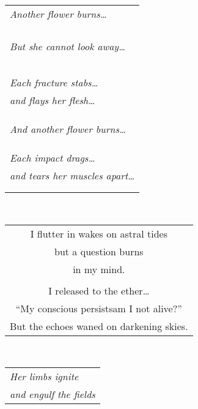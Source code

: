 \documentclass{article}
\begin{document}
\begin{center}
\begin{tabular}{l}
\textit{Another flower burns\ldots} \\
\\
\\
\\
\\
\textit{But she cannot look away\ldots} \\
\\
\\
\\
\\
\\
\textit{Each fracture stabs\ldots} \\
\textit{and flays her flesh\ldots} \\
\\
\\
\\
\textit{And another flower burns\ldots} \\
\\
\\
\\
\textit{Each impact drags\ldots} \\
\textit{and tears her muscles apart\ldots} \\
\\
\\
\end{tabular} \\
\begin{tabular}{c}
\\
I flutter in wakes on astral tides \\
but a question burns \\
in my mind. \\
\\
I released to the ether\ldots{} \\
``My conscious persists\hspace{3ex}am I not alive?'' \\
But the echoes waned on darkening skies. \\
\end{tabular} \\
\begin{tabular}{l}
\\
\textit{Her limbs ignite}\\
\textit{and engulf the fields}\\

\end{tabular}
\end{center}
\end{document}
